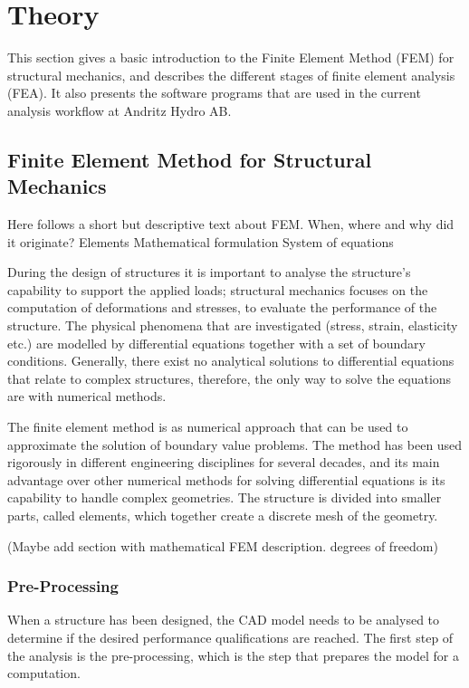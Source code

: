 
\section{Theory} %
\label{sec:theory}
This section gives a basic introduction to the Finite Element Method (FEM) for structural mechanics, and describes the different stages of finite element analysis (FEA). It also presents the software programs that are used in the current analysis workflow at Andritz Hydro AB.

\subsection{Finite Element Method for Structural Mechanics} %
\label{sub:finite_element_method_in_structural_mechanics}
Here follows a short but descriptive text about FEM.
When, where and why did it originate?
Elements
Mathematical formulation
System of equations

During the design of structures it is important to analyse the structure's capability to support the applied loads; structural mechanics focuses on the computation of deformations and stresses, to evaluate the performance of the structure. The physical phenomena that are investigated (stress, strain, elasticity etc.) are modelled by differential equations together with a set of boundary conditions. Generally, there exist no analytical solutions to differential equations that relate to complex structures, therefore, the only way to solve the equations are with numerical methods.

The finite element method is as numerical approach that can be used to approximate the solution of boundary value problems. The method has been used rigorously in different engineering disciplines for several decades, and its main advantage over other numerical methods for solving differential equations is its capability to handle complex geometries. The structure is divided into smaller parts, called elements, which together create a discrete mesh of the geometry.~\cite{ottossen92}

(Maybe add section with mathematical FEM description. degrees of freedom)


\subsubsection{Pre-Processing} %
\label{ssub:pre_processing}
When a structure has been designed, the CAD model needs to be analysed to determine if the desired performance qualifications are reached. The first step of the analysis is the pre-processing, which is the step that prepares the model for a computation.

